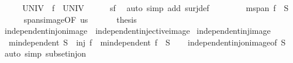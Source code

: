 \begin{isabellebody}
%
\isadelimproof
%
\endisadelimproof
%
\isatagproof
{}\isamarkupfalse%
\ {\isacharminus}{\kern0pt}\isanewline
\ \ \isamarkupfalse%
\ {\isachardoublequoteopen}UNIV\ {\isasymsubseteq}\ f\ {\isacharbackquote}{\kern0pt}\ UNIV{\isachardoublequoteclose}\isanewline
\ \ \ \ \isamarkupfalse%
\ sf\ \isamarkupfalse%
\ {\isacharparenleft}{\kern0pt}auto\ simp\ add{\isacharcolon}{\kern0pt}\ surj{\isacharunderscore}{\kern0pt}def{\isacharparenright}{\kern0pt}\isanewline
\ \ \isamarkupfalse%
\ \isamarkupfalse%
\ {\isachardoublequoteopen}\ {\isasymdots}\ {\isasymsubseteq}\ m{}{\isachardot}{\kern0pt}span\ {\isacharparenleft}{\kern0pt}f\ {\isacharbackquote}{\kern0pt}\ S{\isacharparenright}{\kern0pt}{\isachardoublequoteclose}\isanewline
\ \ \ \ \isamarkupfalse%
\ spans{\isacharunderscore}{\kern0pt}image{\isacharbrackleft}{\kern0pt}OF\ us{\isacharbrackright}{\kern0pt}\ \isacommand{{\isachardot}{\kern0pt}}\isamarkupfalse%
\isanewline
\ \ \isamarkupfalse%
\ \isamarkupfalse%
\ {\isacharquery}{\kern0pt}thesis\ \isacommand{{\isachardot}{\kern0pt}}\isamarkupfalse%
\isanewline
{}\isamarkupfalse%
%
\endisatagproof
{\isafoldproof}%
%
\isadelimproof
\isanewline
%
\endisadelimproof
\isanewline
{}\isamarkupfalse%
\ independent{\isacharunderscore}{\kern0pt}inj{\isacharunderscore}{\kern0pt}on{\isacharunderscore}{\kern0pt}image\ {\isacharequal}{\kern0pt}\ independent{\isacharunderscore}{\kern0pt}injective{\isacharunderscore}{\kern0pt}image\isanewline
\isanewline
{}\isamarkupfalse%
\ independent{\isacharunderscore}{\kern0pt}inj{\isacharunderscore}{\kern0pt}image{\isacharcolon}{\kern0pt}\isanewline
\ \ {\isachardoublequoteopen}m{}{\isachardot}{\kern0pt}independent\ S\ {\isasymLongrightarrow}\ inj\ f\ {\isasymLongrightarrow}\ m{}{\isachardot}{\kern0pt}independent\ {\isacharparenleft}{\kern0pt}f\ {\isacharbackquote}{\kern0pt}\ S{\isacharparenright}{\kern0pt}{\isachardoublequoteclose}\isanewline
%
\isadelimproof
\ \ %
\endisadelimproof
%
\isatagproof
{}\isamarkupfalse%
\ independent{\isacharunderscore}{\kern0pt}inj{\isacharunderscore}{\kern0pt}on{\isacharunderscore}{\kern0pt}image{\isacharbrackleft}{\kern0pt}of\ S{\isacharbrackright}{\kern0pt}\ \isamarkupfalse%
\ {\isacharparenleft}{\kern0pt}auto\ simp{\isacharcolon}{\kern0pt}\ subset{\isacharunderscore}{\kern0pt}inj{\isacharunderscore}{\kern0pt}on{\isacharparenright}{\kern0pt}%
\endisatagproof

\end{isabellebody}
